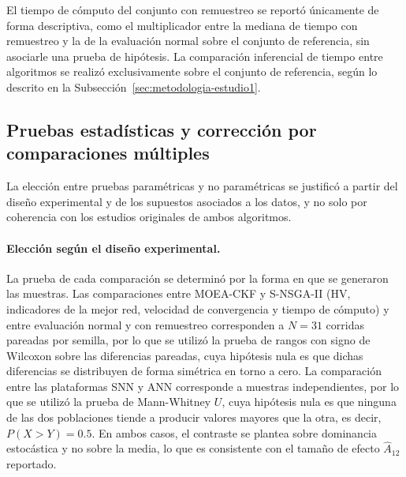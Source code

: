 El tiempo de cómputo del conjunto con remuestreo se reportó únicamente de forma descriptiva, como el multiplicador entre la mediana de tiempo con remuestreo y la de la evaluación normal sobre el conjunto de referencia, sin asociarle una prueba de hipótesis. La comparación inferencial de tiempo entre algoritmos se realizó exclusivamente sobre el conjunto de referencia, según lo descrito en la Subsección~\ref{sec:metodologia-estudio1}.

\subsection{Pruebas estadísticas y corrección por comparaciones múltiples}\label{subsec:pruebas-estadisticas-correccion}

La elección entre pruebas paramétricas y no paramétricas se justificó a partir del diseño experimental y de los supuestos asociados a los datos, y no solo por coherencia con los estudios originales de ambos algoritmos.

\paragraph{Elección según el diseño experimental.} La prueba de cada comparación se determinó por la forma en que se generaron las muestras. Las comparaciones entre MOEA-CKF y S-NSGA-II (HV, indicadores de la mejor red, velocidad de convergencia y tiempo de cómputo) y entre evaluación normal y con remuestreo corresponden a $N=31$ corridas pareadas por semilla, por lo que se utilizó la prueba de rangos con signo de Wilcoxon sobre las diferencias pareadas, cuya hipótesis nula es que dichas diferencias se distribuyen de forma simétrica en torno a cero. La comparación entre las plataformas SNN y ANN corresponde a muestras independientes, por lo que se utilizó la prueba de Mann-Whitney $U$, cuya hipótesis nula es que ninguna de las dos poblaciones tiende a producir valores mayores que la otra, es decir, $P(X>Y)=0.5$. En ambos casos, el contraste se plantea sobre dominancia estocástica y no sobre la media, lo que es consistente con el tamaño de efecto $\hat{A}_{12}$ reportado.

